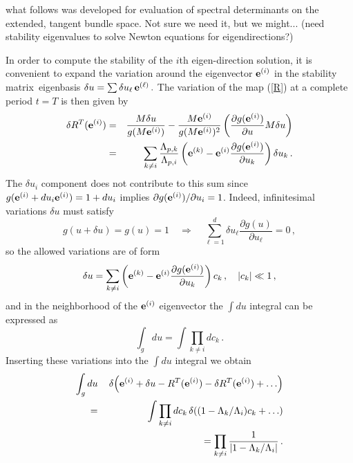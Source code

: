  what follows was developed for evaluation
of spectral determinants on the extended, tangent bundle space. Not
sure we need it, but we might... (need stability eigenvalues
to solve Newton equations for eigendirections?)

In order to
compute the stability of the $i$th eigen-direction solution, it
is convenient to expand the variation around the eigenvector
$\jEigvec[i]$ in the stability matrix\ eigenbasis
$
\delta {u} = \sum \delta u_\ell \, \jEigvec[\ell]
\, .
$
The variation of the map (\ref{R}) at a complete period $t=T$
is then given by
\begin{eqnarray}
\delta R^T (\jEigvec[i])  &=&
\frac{\monodromy \delta{u}}{g(\monodromy \jEigvec[i])}
-\frac{\monodromy \jEigvec[i] }{g(\monodromy \jEigvec[i])^2}
\left(
 \frac{\partial g(\jEigvec[i])}{\partial {u}}
	 \monodromy  \delta{u}
\right)
			\nonumber \\
	&=&
\sum_{k \neq i} \frac{\ExpaEig_{p,k} }{ \ExpaEig_{p,i }}
 \left( \jEigvec[k] -\jEigvec[i]
       \frac{\partial g(\jEigvec[i])}{\partial u_k}\right)\delta u_k
\, .
\label{var_R}
\end{eqnarray}
The $\delta u_i$ component does not contribute to this sum
since $g(\jEigvec[i]+du_i\jEigvec[i])=1+du_i$ implies $\partial
g(\jEigvec[i]) / \partial u_i = 1$. Indeed, infinitesimal
variations $\delta{u}$ must satisfy
\[
g({u}+\delta{u})=g({u})=1 \quad \Longrightarrow \quad
\sum_{\ell=1}^d \delta u_\ell
	  \frac{ \partial g({u})}{\partial u_\ell} = 0
\,,
\]
so the allowed variations are of form
\[
\delta {u} = \sum_{k\neq i}
		\left( \jEigvec[k] -\jEigvec[i]
              \frac{\partial g(\jEigvec[i])}{\partial u_k}\right)c_k
    \,, \quad |c_k| \ll 1
\, ,
\]
and in the neighborhood of the $\jEigvec[i]$ eigenvector
the $\int d{u}$ integral can be expressed as
\[
\int_g d{u} = \int \prod_{k\neq i} dc_k
\, .
\]
%
Inserting these variations into the $\int d{u}$ integral we obtain
\begin{eqnarray}
\int_g d{u}\, &&
\prpgtr{ \jEigvec[i]+\delta{u} -R^{T}(\jEigvec[i])
				-\delta R^T(\jEigvec[i]) + \dots}
	\nonumber \\
= \, && \int \prod_{k\neq i} dc_k \,
	\prpgtr{(1-\ExpaEig_{k}/\ExpaEig_{i}) c_k + \dots }
	\nonumber \\
	&&= \prod_{k\neq i} \frac{ 1}{ \left| 1-
			{\ExpaEig_{k} / \ExpaEig_{i } }\right|}
\, .
\nonumber
\end{eqnarray}


